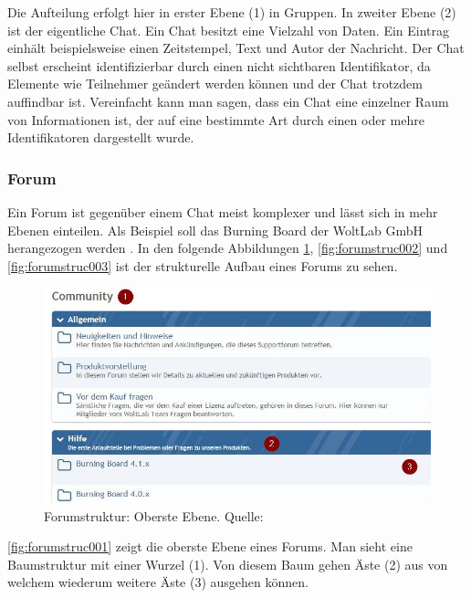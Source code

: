 \documentclass[a4paper]{article}
\begin{document}
	Die Aufteilung erfolgt hier in erster Ebene (1) in Gruppen. In zweiter Ebene (2)
	ist der eigentliche Chat. Ein Chat besitzt eine Vielzahl von Daten. Ein
	Eintrag einhält beispielsweise einen Zeitstempel, Text und Autor der
	Nachricht. Der Chat selbst erscheint identifizierbar durch einen nicht
	sichtbaren Identifikator, da Elemente wie Teilnehmer geändert werden können
	und der Chat trotzdem auffindbar ist. Vereinfacht kann man sagen, dass ein
	Chat eine einzelner Raum von Informationen ist, der auf eine bestimmte Art
	durch einen oder mehre Identifikatoren dargestellt wurde.
	
	\subsubsection{Forum}	
	
	Ein Forum ist gegenüber einem Chat meist komplexer und lässt sich in mehr
	Ebenen einteilen. Als Beispiel soll das	Burning Board der WoltLab GmbH
	herangezogen werden \cite{BB}. In den folgende Abbildungen
	\ref{fig:forumstruc001}, \ref{fig:forumstruc002} und \ref{fig:forumstruc003}
	ist der strukturelle Aufbau eines Forums zu sehen.
	
	\begin{figure}[H] 
		\centerline{
			\includegraphics[scale=0.65]{../Bilder/forumstruc001.jpg}
		}
		\caption{Forumstruktur: Oberste Ebene. Quelle: \cite{BB}}
		\label{fig:forumstruc001}
	\end{figure}	
	
	\autoref{fig:forumstruc001} zeigt die oberste Ebene eines Forums. Man sieht
	eine Baumstruktur mit einer Wurzel (1). Von diesem Baum gehen Äste (2) aus
	von welchem wiederum weitere Äste (3) ausgehen können.
	
\end{document}

